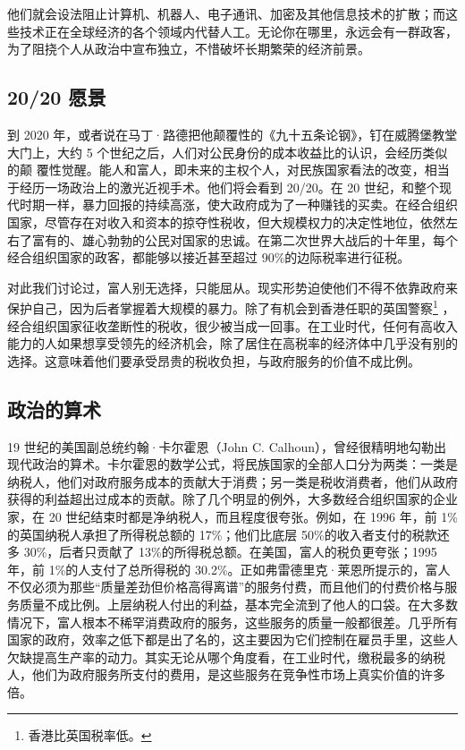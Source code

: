 他们就会设法阻止计算机、机器人、电子通讯、加密及其他信息技术的扩散；而这些技术正在全球经济的各个领域内代替人工。无论你在哪里，永远会有一群政客，为了阻挠个人从政治中宣布独立，不惜破坏长期繁荣的经济前景。

\subsection{20/20 愿景}
到 2020 年，或者说在马丁·路德把他颠覆性的《九十五条论钢》，钉在威腾堡教堂大门上，大约 5 个世纪之后，人们对公民身份的成本收益比的认识，会经历类似的颠 覆性觉醒。能人和富人，即未来的主权个人，对民族国家看法的改变，相当于经历一场政治上的激光近视手术。他们将会看到 20/20。在 20 世纪，和整个现代时期一样，暴力回报的持续高涨，使大政府成为了一种赚钱的买卖。在经合组织国家，尽管存在对收入和资本的掠夺性税收，但大规模权力的决定性地位，依然左右了富有的、雄心勃勃的公民对国家的忠诚。在第二次世界大战后的十年里，每个经合组织国家的政客，都能够以接近甚至超过 90\%的边际税率进行征税。

对此我们讨论过，富人别无选择，只能屈从。现实形势迫使他们不得不依靠政府来保护自己，因为后者掌握着大规模的暴力。除了有机会到香港任职的英国警察\footnote{香港比英国税率低。} ，经合组织国家征收垄断性的税收，很少被当成一回事。在工业时代，任何有高收入能力的人如果想享受领先的经济机会，除了居住在高税率的经济体中几乎没有别的选择。这意味着他们要承受昂贵的税收负担，与政府服务的价值不成比例。

\subsection{政治的算术}
19 世纪的美国副总统约翰·卡尔霍恩（John C. Calhoun），曾经很精明地勾勒出现代政治的算术。卡尔霍恩的数学公式，将民族国家的全部人口分为两类：一类是纳税人，他们对政府服务成本的贡献大于消费；另一类是税收消费者，他们从政府获得的利益超出过成本的贡献。除了几个明显的例外，大多数经合组织国家的企业家，在 20 世纪结束时都是净纳税人，而且程度很夸张。例如，在 1996 年，前 1\%的英国纳税人承担了所得税总额的 17\%；他们比底层 50\%的收入者支付的税款还多 30\%，后者只贡献了 13\%的所得税总额。在美国，富人的税负更夸张；1995 年，前 1\%的人支付了总所得税的 30.2\%。正如弗雷德里克·莱恩所提示的，富人不仅必须为那些“质量差劲但价格高得离谱”的服务付费，而且他们的付费价格与服务质量不成比例。上层纳税人付出的利益，基本完全流到了他人的口袋。在大多数情况下，富人根本不稀罕消费政府的服务，这些服务的质量一般都很差。几乎所有国家的政府，效率之低下都是出了名的，这主要因为它们控制在雇员手里，这些人欠缺提高生产率的动力。其实无论从哪个角度看，在工业时代，缴税最多的纳税人，他们为政府服务所支付的费用，是这些服务在竞争性市场上真实价值的许多倍。

